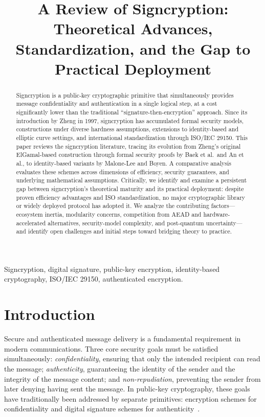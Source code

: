 \documentclass[conference]{IEEEtran}
\begin{document}
\title{A Review of Signcryption: Theoretical Advances, Standardization, and the Gap to Practical Deployment}

\author{
}

\maketitle

\begin{abstract}
Signcryption is a public-key cryptographic primitive that simultaneously provides message confidentiality and authentication in a single logical step, at a cost significantly lower than the traditional ``signature-then-encryption'' approach. Since its introduction by Zheng in 1997, signcryption has accumulated formal security models, constructions under diverse hardness assumptions, extensions to identity-based and elliptic curve settings, and international standardization through ISO/IEC 29150. This paper reviews the signcryption literature, tracing its evolution from Zheng's original ElGamal-based construction through formal security proofs by Baek et al.\ and An et al., to identity-based variants by Malone-Lee and Boyen. A comparative analysis evaluates these schemes across dimensions of efficiency, security guarantees, and underlying mathematical assumptions. Critically, we identify and examine a persistent gap between signcryption's theoretical maturity and its practical deployment: despite proven efficiency advantages and ISO standardization, no major cryptographic library or widely deployed protocol has adopted it. We analyze the contributing factors---ecosystem inertia, modularity concerns, competition from AEAD and hardware-accelerated alternatives, security-model complexity, and post-quantum uncertainty---and identify open challenges and initial steps toward bridging theory to practice.
\end{abstract}

\begin{IEEEkeywords}
Signcryption, digital signature, public-key encryption, identity-based cryptography, ISO/IEC 29150, authenticated encryption.
\end{IEEEkeywords}

\section{Introduction}

Secure and authenticated message delivery is a fundamental requirement in modern communications. Three core security goals must be satisfied simultaneously: \textit{confidentiality}, ensuring that only the intended recipient can read the message; \textit{authenticity}, guaranteeing the identity of the sender and the integrity of the message content; and \textit{non-repudiation}, preventing the sender from later denying having sent the message. In public-key cryptography, these goals have traditionally been addressed by separate primitives: encryption schemes for confidentiality and digital signature schemes for authenticity~\cite{zheng1997}.
\end{document}
